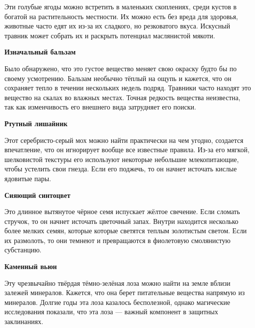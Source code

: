 \documentclass[a4paper, 9pt, twocolumn]{book}
\begin{document}
	\smallskip
	
	\noindent Эти голубые ягоды можно встретить в маленьких скоплениях, среди кустов в богатой на растительность местности. Их можно есть без вреда для здоровья, животные часто едят их из-за их сладкого, но резковатого вкуса. Искусный травник может собрать их и раскрыть потенциал маслянистой мякоти.
	
	\medspace
	
	\noindent \textbf{Изначальный бальзам}
	
	\smallskip
	
	\noindent Было обнаружено, что это густое вещество меняет свою окраску будто бы по своему усмотрению. Бальзам необычно тёплый на ощупь и кажется, что он сохраняет тепло в течении нескольких недель подряд. Травники часто находят это вещество на скалах во влажных местах. Точная редкость вещества неизвестна, так как изменчивость его внешнего вида затрудняет его поиски.
	
	\medspace
	
	\noindent \textbf{Ртутный лишайник}
	
	\smallskip
	
	\noindent Этот серебристо-серый мох можно найти практически на чем угодно, создается впечатление, что он игнорирует вообще все известные правила. Из-за его мягкой, шелковистой текстуры его используют некоторые небольшие млекопитающие, чтобы устелить свои гнезда. Если его поджечь, то он начнет источать кислые ядовитые пары.
	
	\medspace
	
	\noindent \textbf{Сияющий синтоцвет}
	
	\smallskip
	
	\noindent Это длинное вытянутое чёрное семя испускает жёлтое свечение. Если сломать стручок, то он начнет источать цветочный запах. Внутри находится несколько более мелких семян, которые  которые светятся теплым золотистым светом. Если их размолоть, то они темнеют и превращаются в фиолетовую смолянистую субстанцию.
	
	\medspace
	
	\noindent \textbf{Каменный вьюн}
	
	\smallskip
	
	\noindent Эту чрезвычайно твёрдая тёмно-зелёная лоза можно найти на земле вблизи залежей минералов. Кажется, что она берет питательные вещества напрямую из минералов. Долгие годы эта лоза казалось бесполезной, однако магические исследования показали, что эта лоза --- важный компонент в защитных заклинаниях.
	
\end{document}
